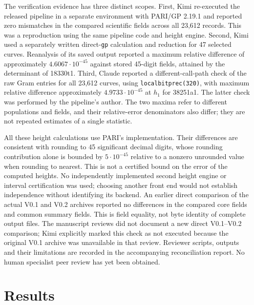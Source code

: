 \documentclass[11pt,a4paper]{article}
\begin{document}
The verification evidence has three distinct scopes. First, Kimi re-executed the released pipeline in a separate environment with PARI/GP 2.19.1 and reported zero mismatches in the compared scientific fields across all 23,612 records. This was a reproduction using the same pipeline code and height engine. Second, Kimi used a separately written direct-\texttt{gp} calculation and reduction for 47 selected curves. Reanalysis of its saved output reported a maximum relative difference of approximately $4.6067\cdot10^{-45}$ against stored 45-digit fields, attained by the determinant of 18330t1. Third, Claude reported a different-call-path check of the raw Gram entries for all 23,612 curves, using \texttt{localbitprec(320)}, with maximum relative difference approximately $4.9733\cdot10^{-45}$ at $h_1$ for 38251a1. The latter check was performed by the pipeline's author. The two maxima refer to different populations and fields, and their relative-error denominators also differ; they are not repeated estimates of a single statistic.

All these height calculations use PARI's implementation. Their differences are consistent with rounding to 45 significant decimal digits, whose rounding contribution alone is bounded by $5\cdot10^{-45}$ relative to a nonzero unrounded value when rounding to nearest. This is not a certified bound on the error of the computed heights. No independently implemented second height engine or interval certification was used; choosing another front end would not establish independence without identifying its backend. An earlier direct comparison of the actual V0.1 and V0.2 archives reported no differences in the compared core fields and common summary fields. This is field equality, not byte identity of complete output files. The manuscript reviews did not document a new direct V0.1--V0.2 comparison; Kimi explicitly marked this check as not executed because the original V0.1 archive was unavailable in that review. Reviewer scripts, outputs and their limitations are recorded in the accompanying reconciliation report. No human specialist peer review has yet been obtained.

\section{Results}
\end{document}
